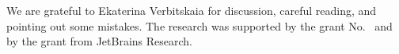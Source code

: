 \documentclass[sigplan,10pt,review]{acmart}\settopmatter{printfolios=true, printccs=false, printacmref=false}
\begin{document}







\begin{acks}                            %


  We are grateful to Ekaterina Verbitskaia for discussion, careful reading, and pointing out some mistakes.
  The research was supported by the  grant
  No.~ and by the grant from JetBrains Research.
\end{acks}



\end{document}
